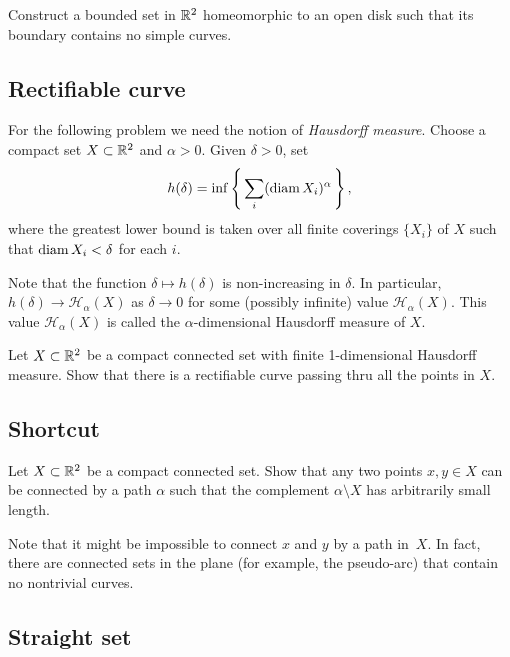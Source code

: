 \begin{pr}
Construct 
a bounded set in $\mathbb{R}^2$
homeomorphic to an open disk
such that 
its boundary contains no simple curves.
\end{pr}

\subsection*{Rectifiable curve}
\label{Rectifiable curve}

For the following problem we need the notion of 
\emph{Hausdorff measure}.
Choose a compact set $X\subset\mathbb{R}^2$ and $\alpha>0$.
Given $\delta>0$, set
\[h(\delta)=\inf\left\{\,\sum_i(\operatorname{\rm diam}\nolimits X_i)^\alpha\,\right\},\]
where the greatest lower bound is taken over all finite coverings $\{X_i\}$ of $X$ 
such that $\operatorname{\rm diam}\nolimits X_i<\delta$ for each $i$.

Note that the function $\delta\mapsto h(\delta)$ is non-increasing in $\delta$.
In particular, $h(\delta)\to \mathcal{H}_\alpha(X)$ as $\delta\to 0$ for some (possibly infinite) value $\mathcal{H}_\alpha(X)$.
This value $\mathcal{H}_\alpha(X)$ is called the $\alpha$-dimensional Hausdorff measure of $X$.

\begin{pr}
Let $X\subset \mathbb{R}^2$ be a compact connected set
with finite 1-dimensional Hausdorff measure. 
Show that there is a rectifiable curve passing thru all the points in $X$.
\end{pr}

\subsection*{Shortcut\hard}

\begin{pr}
Let $X\subset \mathbb{R}^2$ be a compact connected set. 
Show that any two points $x,y\in X$ can be connected by a path $\alpha$ such that the complement $\alpha\setminus X$ has arbitrarily small length.
\end{pr}

Note that it might be impossible to connect $x$ and $y$ by a path in~$X$.
In fact, there are connected sets in the plane (for example, the pseudo-arc) that contain no nontrivial curves.

\subsection*{Straight set}

